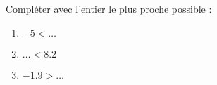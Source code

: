 
\begin{mental}
    Compléter avec l'entier le plus proche possible :
    \begin{enumerate}
        \item
            \( -5<\ldots\)
        \item
            \( \ldots<8.2\)
        \item
            \( -1.9>\ldots\)
    \end{enumerate}
\end{mental}

